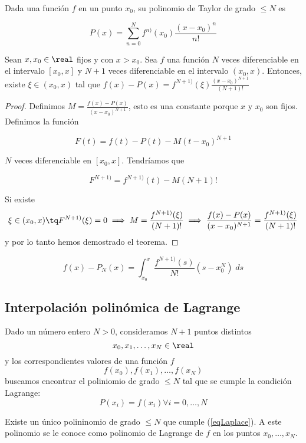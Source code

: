 \documentclass[nochap]{apuntes}
\begin{document}
\begin{defn}
Dada una función $f$ en un punto $x_0$, su polinomio de Taylor de grado $≤N$ es

\[ P(x) = \sum_{n=0}^N f^{n)}(x_0)\frac{(x-x_0)^n}{n!}\]
\end{defn}

\begin{theorem}
Sean $x, x_0 \in \real$ fijos y con $x>x_0$. Sea $f$ una función $N$ veces diferenciable en el intervalo $[x_0, x]$ y $N+1$ veces diferenciable en el intervalo $(x_0, x)$. Entonces, existe $\xi \in (x_0, x)$ tal que $f(x)-P(x) = f^{N+1)}(\xi)\frac{(x-x_0)^{N+1}}{(N+1)!}$
\end{theorem}

\begin{proof}
Definimos $M=\frac{f(x)-P(x)}{(x-x_0)^{N+1}}$, esto es una constante porque $x$ y $x_0$ son fijos. Definimos la función 

\[ F(t) = f(t) - P(t) - M(t-x_0)^{N+1} \]

$N$ veces diferenciable en $[x_0, x]$. Tendríamos que

\[ F^{N+1)} = f^{N+1)}(t) - M(N+1)! \]

Si existe \[ \xi\in (x_0, x) \tq F^{N+1)}(\xi) = 0 \implies M = \frac{f^{N+1)}(\xi)}{(N+1)!} \implies \frac{f(x)-P(x)}{(x-x_0)^{N+1}} = \frac{f^{N+1)}(\xi)}{(N+1)!} \] y por lo tanto hemos demostrado el teorema.
\end{proof}

\begin{theorem}
\[ f(x) - P_N(x) = \int_{x_0}^{x} \frac{f^{N+1)}(s)}{N!}(s-x_0^N)\;ds \]
\end{theorem}

\subsection{Interpolación polinómica de Lagrange}

Dado un número entero $N>0$, consideramos $N+1$ puntos distintos \[ x_0, x_1,\dotsc,x_N\in \real \] y los correspondientes valores de una función $f$ \[ f(x_0), f(x_1), \dotsc, f(x_N) \] buscamos encontrar el poliniomio de grado $≤N$ tal que se cumple la condición Lagrange:
\begin{equation} P(x_i) = f(x_i) \forall i= 0, \dotsc, N \label{eqLaplace}\end{equation}

\begin{theorem}
Existe un único polininomio de grado $≤N$ que cumple (\ref{eqLaplace}). A este polinomio se le conoce como polinomio de Lagrange de $f$ en los puntos $x_0, \dotsc, x_N$.
\end{theorem}
\end{document}
